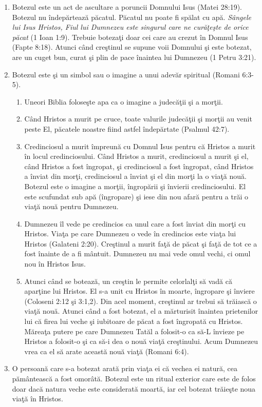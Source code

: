 \begin{enumerate}

	\item Botezul este un act de ascultare a poruncii Domnului Isus (Matei 28:19). Botezul nu îndepărtează păcatul. Păcatul nu poate fi spălat cu apă. \textit{Sângele lui Isus Hristos, Fiul lui Dumnezeu este singurul care ne curăţeşte de orice păcat} (1 Ioan 1:9). Trebuie botezaţi doar cei care au crezut în Domnul Isus (Fapte 8:18). Atunci când creştinul se supune voii Domnului şi este botezat, are un cuget bun, curat şi plin de pace înaintea lui Dumnezeu (1 Petru 3:21).
	
	\item Botezul este şi un simbol sau o imagine a unui adevăr spiritual (Romani 6:3-5).
	
	\begin{enumerate}
		\item Uneori Biblia foloseşte apa ca o imagine a judecăţii şi a morţii. 
		\item Când Hristos a murit pe cruce, toate valurile judecăţii şi morţii au venit peste El, păcatele noastre fiind astfel îndepărtate (Psalmul 42:7).
		
		\item Credinciosul a murit împreună cu Domnul Isus pentru că Hristos a murit în locul credinciosului. Când Hristos a murit, credinciosul a murit şi el, când Hristos a fost îngropat, şi credinciosul a fost îngropat, când Hristos a înviat din morţi, credinciosul a înviat şi el din morţi la o viaţă nouă. Botezul este o imagine a morţii, îngropării şi învierii credinciosului. El este scufundat sub apă (îngropare) şi iese din nou afară pentru a trăi o viaţă nouă pentru Dumnezeu.
		
		\item Dumnezeu îl vede pe credincios ca unul care a fost înviat din morţi cu Hristos. Viaţa pe care Dumnezeu o vede în credincios este viaţa lui Hristos (Galateni 2:20). Creştinul a murit faţă de păcat şi faţă de tot ce a fost înainte de a fi mântuit. Dumnezeu nu mai vede omul vechi, ci omul nou în Hristos Isus.
		
		\item Atunci când se botează, un creştin le permite celorlalţi să vadă că aparţine lui Hristos. El s-a unit cu Hristos în moarte, îngropare şi înviere (Coloseni 2:12 şi 3:1,2). Din acel moment, creştinul ar trebui să trăiască o viaţă nouă. Atunci când a fost botezat, el a mărturisit înaintea prietenilor lui că firea lui veche şi iubitoare de păcat a fost îngropată cu Hristos. Măreaţa putere pe care Dumnezeu Tatăl a folosit-o ca să-L învieze pe Hristos a folosit-o şi ca să-i dea o nouă viaţă creştinului. Acum Dumnezeu vrea ca el să arate această nouă viaţă (Romani 6:4).
	\end{enumerate}
	
	\item O persoană care s-a botezat arată prin viaţa ei că vechea ei natură, cea pământească a fost omorâtă. Botezul este un ritual exterior care este de folos doar dacă natura veche este considerată moartă, iar cel botezat trăieşte noua viaţă în Hristos. 
	
\end{enumerate}

